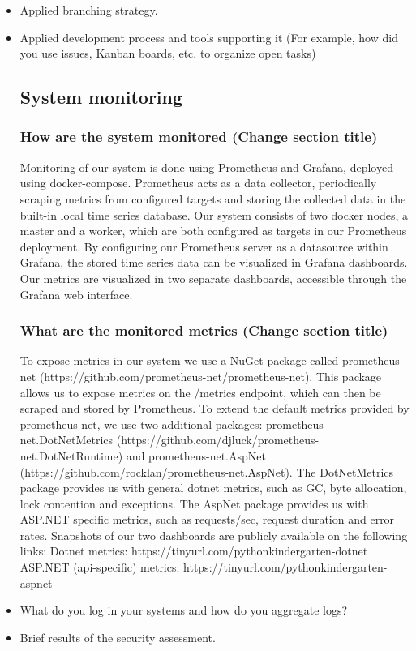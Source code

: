   
  \begin{itemize}

  \item Applied branching strategy.
  \item Applied development process and tools supporting it (For example, how did you use issues, Kanban boards, etc. to organize open tasks)
  \subsection{System monitoring}
  \subsubsection{How are the system monitored (Change section title)}
  Monitoring of our system is done using Prometheus and Grafana, deployed using docker-compose. \newline
  Prometheus acts as a data collector, periodically scraping metrics from configured targets and storing the collected data in the built-in local time series database.\newline
  Our system consists of two docker nodes, a master and a worker, which are both configured as targets in our Prometheus deployment.\newline
  By configuring our Prometheus server as a datasource within Grafana, the stored time series data can be visualized in Grafana dashboards. Our metrics are visualized in two separate dashboards, accessible through the Grafana web interface.

  \subsubsection{What are the monitored metrics (Change section title)}
  To expose metrics in our system we use a NuGet package called prometheus-net (https://github.com/prometheus-net/prometheus-net).
  This package allows us to expose metrics on the /metrics endpoint, which can then be scraped and stored by Prometheus.
  \newline
  To extend the default metrics provided by prometheus-net, we use two additional packages: 
  prometheus-net.DotNetMetrics (https://github.com/djluck/prometheus-net.DotNetRuntime) and prometheus-net.AspNet (https://github.com/rocklan/prometheus-net.AspNet).
  \newline
  The DotNetMetrics package provides us with general dotnet metrics, such as GC, byte allocation, lock contention and exceptions.
  \newline
  The AspNet package provides us with ASP.NET specific metrics, such as requests/sec, request duration and error rates.
  \newline
  \newline
  Snapshots of our two dashboards are publicly available on the following links:
  \newline
  Dotnet metrics: https://tinyurl.com/pythonkindergarten-dotnet
  \newline
  ASP.NET (api-specific) metrics: https://tinyurl.com/pythonkindergarten-aspnet
  \item What do you log in your systems and how do you aggregate logs?
  \item Brief results of the security assessment.

\end{itemize}
